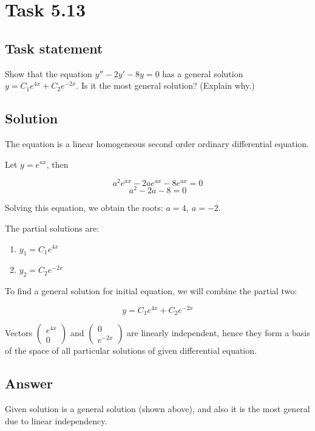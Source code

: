 \section*{Task 5.13}

\subsection*{Task statement}

Show that the equation $y'' - 2y' - 8y = 0$ has a general solution $y = C_1 e^{4x} + C_2 e^{-2x}$. Is it the most general solution? (Explain why.)

\subsection*{Solution}

The equation is a linear homogeneous second order ordinary differential equation.

Let $y = e^{ax}$, then

\[a^2 e^{ax} - 2a e^{ax} - 8 e^{ax} = 0\]
\[a^2 - 2a - 8 = 0\]

Solving this equation, we obtain the roots: $a = 4,\ a = -2$.

The partial solutions are:
\begin{enumerate}
    \item $y_1 = C_1 e^{4x}$
    \item $y_2 = C_2 e^{-2x}$
\end{enumerate}

To find a general solution for initial equation, we will combine the partial two:

\[y = C_1 e^{4x} + C_2 e^{-2x}\]

Vectors $\begin{pmatrix}e^{4x} \\ 0 \end{pmatrix}$ and $\begin{pmatrix}0 \\ e^{-2x} \end{pmatrix}$ are linearly independent, hence they form a basis of the space of all particular solutions of given differential equation.

\subsection*{Answer}

Given solution is a general solution (shown above), and also it is the most general due to linear independency.
